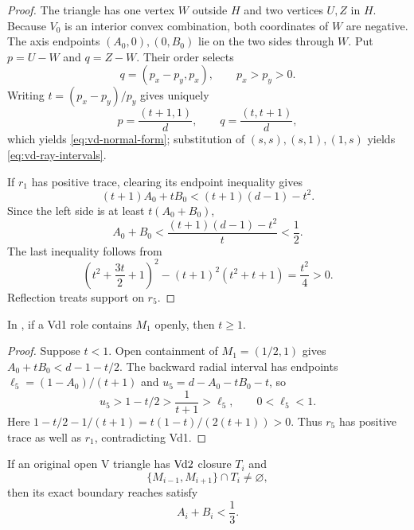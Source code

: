 \begin{proof}
The triangle has one vertex $W$ outside $H$ and two vertices $U,Z$ in $H$.
Because $V_0$ is an interior convex combination, both coordinates of $W$ are
negative.  The axis endpoints $(A_0,0),(0,B_0)$ lie on the two sides through
$W$.  Put $p=U-W$ and $q=Z-W$.  Their order selects
\[
 q=(p_x-p_y,p_x),\qquad p_x>p_y>0.
\]
Writing $t=(p_x-p_y)/p_y$ gives uniquely
\[
 p=\frac{(t+1,1)}d,\qquad q=\frac{(t,t+1)}d,
\]
which yields \eqref{eq:vd-normal-form}; substitution of
$(s,s),(s,1),(1,s)$ yields \eqref{eq:vd-ray-intervals}.

If $r_1$ has positive trace, clearing its endpoint inequality gives
\[
 (t+1)A_0+tB_0<(t+1)(d-1)-t^2.
\]
Since the left side is at least $t(A_0+B_0)$,
\[
 A_0+B_0<\frac{(t+1)(d-1)-t^2}{t}<\frac12.
\]
The last inequality follows from
\[
 \left(t^2+\frac{3t}{2}+1\right)^2
 -(t+1)^2(t^2+t+1)=\frac{t^2}{4}>0.
\]
Reflection treats support on $r_5$.
\end{proof}

\begin{lemma}
\label{lem:vd1-forward-orientation}
In , if a Vd1 role contains $M_1$
openly, then $t\ge1$.
\end{lemma}
\begin{proof}
Suppose $t<1$. Open containment of $M_1=(1/2,1)$ gives
$A_0+tB_0<d-1-t/2$. The backward radial interval has endpoints
$\ell_5=(1-A_0)/(t+1)$ and $u_5=d-A_0-tB_0-t$, so
\[
 u_5>1-t/2>\frac1{t+1}>\ell_5,
 \qquad 0<\ell_5<1.
\]
Here $1-t/2-1/(t+1)=t(1-t)/(2(t+1))>0$.
Thus $r_5$ has positive trace as well as $r_1$, contradicting Vd1.
\end{proof}

\begin{lemma}
\label{lem:vd2-neighbor-midpoint-cap}
If an original open V triangle has $\mathrm{Vd2}$ closure $T_i$ and
\[
 \{M_{i-1},M_{i+1}\}\cap T_i\ne\varnothing,
\]
then its exact boundary reaches satisfy
\[
 A_i+B_i<\frac13.
\]
\end{lemma}

